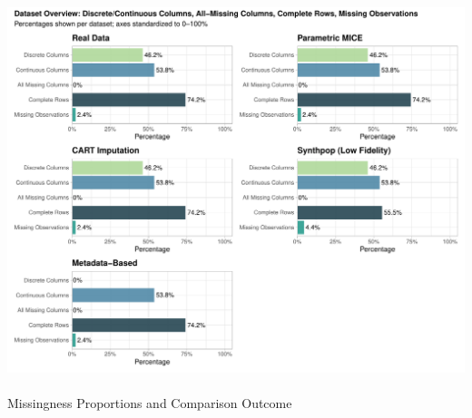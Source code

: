 \documentclass[
  letterpaper,
  DIV=11,
  numbers=noendperiod]{scrartcl}
\makeatletter
\let\oldparagraph\paragraph
\renewcommand{\paragraph}{
    \@ifstar
      \xxxParagraphStar
      \xxxParagraphNoStar
  }
\newcommand{\xxxParagraphStar}[1]{\oldparagraph*{#1}\mbox{}}
\newcommand{\xxxParagraphNoStar}[1]{\oldparagraph{#1}\mbox{}}
\makeatother
\begin{document}
\begin{center}
\includegraphics[width=1\linewidth,height=\textheight,keepaspectratio]{heart_failure_synthetic_data_project_files/figure-pdf/intro-plots-1.pdf}
\end{center}

\paragraph{Missingness Proportions and Comparison
Outcome}\label{missingness-proportions-and-comparison-outcome}
\end{document}
